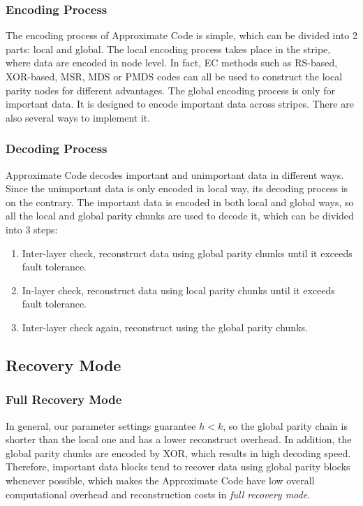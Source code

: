 \documentclass[sigconf]{acmart}
\begin{document}
\subsubsection{Encoding Process}
The encoding process of Approximate Code is simple, which can be divided into 2 parts: local and global.
The local encoding process takes place in the stripe, where data are encoded in node level. In fact, EC methods such as RS-based, XOR-based, MSR, MDS or PMDS codes can all be used to construct the local parity nodes for different advantages.
The global encoding process is only for important data. It is designed to encode important data across stripes. There are also several ways to implement it.
\subsubsection{Decoding Process}
Approximate Code decodes important and unimportant data in different ways. Since the unimportant data is only encoded in local way, its decoding process is on the contrary.
The important data is encoded in both local and global ways, so all the local and global parity chunks are used to decode it, which can be divided into 3 steps:
\begin{enumerate}
\item Inter-layer check, reconstruct data using global parity chunks until it exceeds fault tolerance.
\item In-layer check, reconstruct data using local parity chunks until it exceeds fault tolerance.
\item Inter-layer check again, reconstruct using the global parity chunks.
\end{enumerate}

\subsection{Recovery Mode}
\subsubsection{Full Recovery Mode}
In general, our parameter settings guarantee $h<k$, so the global parity chain is shorter than the local one and has a lower reconstruct overhead.
In addition, the global parity chunks are encoded by XOR, which results in high decoding speed.
Therefore, important data blocks tend to recover data using global parity blocks whenever possible, which makes the Approximate Code have low overall computational overhead and reconstruction costs in \emph{full recovery mode}.
\end{document}
